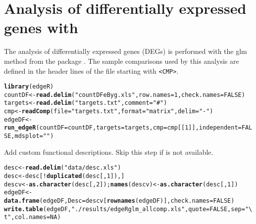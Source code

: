\documentclass{article}\usepackage[]{graphicx}\usepackage[]{color}
\makeatletter
\newcommand{\hlnum}[1]{\textcolor[rgb]{0.686,0.059,0.569}{#1}}%
\newcommand{\hlstr}[1]{\textcolor[rgb]{0.192,0.494,0.8}{#1}}%
\newcommand{\hlopt}[1]{\textcolor[rgb]{0,0,0}{#1}}%
\newcommand{\hlstd}[1]{\textcolor[rgb]{0.345,0.345,0.345}{#1}}%
\newcommand{\hlkwb}[1]{\textcolor[rgb]{0.69,0.353,0.396}{#1}}%
\newcommand{\hlkwc}[1]{\textcolor[rgb]{0.333,0.667,0.333}{#1}}%
\newcommand{\hlkwd}[1]{\textcolor[rgb]{0.737,0.353,0.396}{\textbf{#1}}}%
\newenvironment{kframe}{%
 \def\at@end@of@kframe{}%
 \ifinner\ifhmode%
  \def\at@end@of@kframe{\end{minipage}}%
  \begin{minipage}{\columnwidth}%
 \fi\fi%
 \def\FrameCommand##1{\hskip\@totalleftmargin \hskip-\fboxsep
 \colorbox{shadecolor}{##1}\hskip-\fboxsep
     \hskip-\linewidth \hskip-\@totalleftmargin \hskip\columnwidth}%
 \MakeFramed {\advance\hsize-\width
   \@totalleftmargin\z@ \linewidth\hsize
   \@setminipage}}%
 {\par\unskip\endMakeFramed%
 \at@end@of@kframe}
\newenvironment{knitrout}{}{} %
\makeatother
\begin{document}
\section{Analysis of differentially expressed genes with }
The analysis of differentially expressed genes (DEGs) is performed with the glm method from the  package \citep{Robinson2010-uk}. The sample comparisons used by this analysis are defined in the header lines of the \href{run:targets.txt}{} file starting with \texttt{<CMP>}.
\begin{knitrout}
\color{fgcolor}\begin{kframe}
\begin{alltt}
\hlkwd{library}\hlstd{(edgeR)}
\hlstd{countDF} \hlkwb{<-} \hlkwd{read.delim}\hlstd{(}\hlstr{"countDFeByg.xls"}\hlstd{,} \hlkwc{row.names}\hlstd{=}\hlnum{1}\hlstd{,} \hlkwc{check.names}\hlstd{=}\hlnum{FALSE}\hlstd{)}
\hlstd{targets} \hlkwb{<-} \hlkwd{read.delim}\hlstd{(}\hlstr{"targets.txt"}\hlstd{,} \hlkwc{comment}\hlstd{=}\hlstr{"#"}\hlstd{)}
\hlstd{cmp} \hlkwb{<-} \hlkwd{readComp}\hlstd{(}\hlkwc{file}\hlstd{=}\hlstr{"targets.txt"}\hlstd{,} \hlkwc{format}\hlstd{=}\hlstr{"matrix"}\hlstd{,} \hlkwc{delim}\hlstd{=}\hlstr{"-"}\hlstd{)}
\hlstd{edgeDF} \hlkwb{<-} \hlkwd{run_edgeR}\hlstd{(}\hlkwc{countDF}\hlstd{=countDF,} \hlkwc{targets}\hlstd{=targets,} \hlkwc{cmp}\hlstd{=cmp[[}\hlnum{1}\hlstd{]],} \hlkwc{independent}\hlstd{=}\hlnum{FALSE}\hlstd{,} \hlkwc{mdsplot}\hlstd{=}\hlstr{""}\hlstd{)}
\end{alltt}
\end{kframe}
\end{knitrout}

Add custom functional descriptions. Skip this step if  is not available.
\begin{knitrout}
\color{fgcolor}\begin{kframe}
\begin{alltt}
\hlstd{desc} \hlkwb{<-} \hlkwd{read.delim}\hlstd{(}\hlstr{"data/desc.xls"}\hlstd{)}
\hlstd{desc} \hlkwb{<-} \hlstd{desc[}\hlopt{!}\hlkwd{duplicated}\hlstd{(desc[,}\hlnum{1}\hlstd{]),]}
\hlstd{descv} \hlkwb{<-} \hlkwd{as.character}\hlstd{(desc[,}\hlnum{2}\hlstd{]);} \hlkwd{names}\hlstd{(descv)} \hlkwb{<-} \hlkwd{as.character}\hlstd{(desc[,}\hlnum{1}\hlstd{])}
\hlstd{edgeDF} \hlkwb{<-} \hlkwd{data.frame}\hlstd{(edgeDF,} \hlkwc{Desc}\hlstd{=descv[}\hlkwd{rownames}\hlstd{(edgeDF)],} \hlkwc{check.names}\hlstd{=}\hlnum{FALSE}\hlstd{)}
\hlkwd{write.table}\hlstd{(edgeDF,} \hlstr{"./results/edgeRglm_allcomp.xls"}\hlstd{,} \hlkwc{quote}\hlstd{=}\hlnum{FALSE}\hlstd{,} \hlkwc{sep}\hlstd{=}\hlstr{"\textbackslash{}t"}\hlstd{,} \hlkwc{col.names} \hlstd{=} \hlnum{NA}\hlstd{)}
\end{alltt}
\end{kframe}
\end{knitrout}
\end{document}
